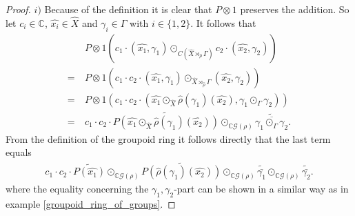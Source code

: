 \documentclass[12pt,a4paper]{scrartcl}
\theoremstyle{plain}
\theoremstyle{definition}
\numberwithin{equation}{section}
\newcommand{\C}{\mathbb{C}} %
\newcommand{\2}{\mathbb{Z} / 2 \mathbb{Z}}
\newcommand{\G}{\mathcal{G}}
\newcommand{\1}{\bar{1}}
\newcommand{\0}{\bar{0}}
\begin{document}
\begin{proof}
	$i)$ Because of the definition it is clear that $P \otimes 1$ preserves the addition. So let $c_i \in \C$, $\hat{x_i} \in \hat{X}$ and $\gamma_i \in \Gamma$ with $i \in \{1,2\}$. It follows that
	\begin{align*}
		 &~ P \otimes 1(c_1 \cdot (\hat{x_1}, \gamma_1) \odot_{C(\hat{X} \rtimes_{\hat{\rho}} \Gamma)} c_2 \cdot (\hat{x_2}, \gamma_2))  \\
		=&~ P \otimes 1(c_1 \cdot  c_2 \cdot (\hat{x_1}, \gamma_1) \odot_{\hat{X} \rtimes_{\hat{\rho}} \Gamma} (\hat{x_2}, \gamma_2)) \\
		=&~ P \otimes 1(c_1 \cdot  c_2 \cdot (\hat{x_1} \odot_{\hat{X}} \hat{\rho}(\gamma_1)(\hat{x_2}), \gamma_1 \odot_{\Gamma} \gamma_2)) \\
		=&~ c_1 \cdot  c_2 \cdot \widetilde{P(\hat{x_1} \odot_{\hat{X}} \hat{\rho}(\gamma_1)(\hat{x_2}))} \odot_{\C\G(\rho)} \widetilde{\overline{\gamma_1 \odot_{\Gamma} \gamma_2}}.
	\end{align*}
	From the definition of the groupoid ring it follows directly that the last term equals 
	\begin{align*}
		c_1 \cdot  c_2 \cdot \widetilde{P(\hat{x_1})} \odot_{\C\G(\rho)} \widetilde{P(\hat{\rho}(\gamma_1)(\hat{x_2}))} \odot_{\C\G(\rho)} \widetilde{\bar{\gamma_1}} \odot_{\C\G(\rho)} \widetilde{\bar{\gamma_2}}.
	\end{align*}
	where the equality concerning the $\gamma_1, \gamma_2$-part can be shown in a similar way as in example \ref{groupoid_ring_of_groups}.
	

\end{proof}
\end{document}
